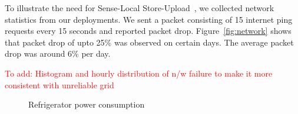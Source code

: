 \documentclass[10pt]{sensys-proc}
\newcommand{\redcolor}[1]{\textcolor{red}{#1}}
\newcommand{\figref}[1]{Figure~\ref{#1}}
\newcommand{\paradigms}{Sense-Local Store-Upload~}
\begin{document}
\noindent To illustrate the need for \paradigms, we collected network statistics from our deployments. We sent a packet consisting of 15 internet ping requests every 15 seconds and reported packet drop. \figref{fig:network} shows that packet drop of upto 25\% was observed on certain days. The average packet drop was around 6\% per day.

\redcolor{To add: Histogram and hourly distribution of n/w failure to make it more consistent with unreliable grid}


\begin{figure}
       
   
    \caption{Refrigerator power consumption}

    \label{fig:metadata}

\end{figure}
	
\end{document}
